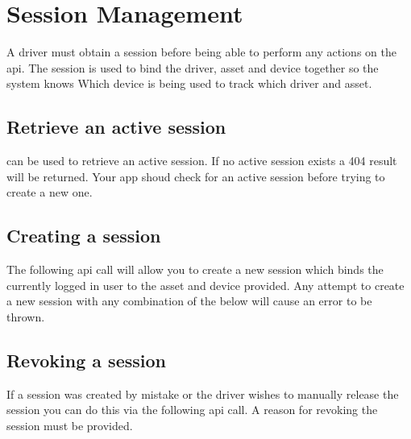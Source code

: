 \documentclass[letterpaper,10pt,english]{sphinxmanual}
\begin{document}
\section{Session Management}
\label{\detokenize{loads/drivers/sessions/session-management:session-management}}\label{\detokenize{loads/drivers/sessions/session-management::doc}}
A driver must obtain a session before being able to perform any actions on the api. The session is used to bind the driver, asset and device together so the system knows Which device is being used to track which driver and asset.


\subsection{Retrieve an active session}
\label{\detokenize{loads/drivers/sessions/session-management:retrieve-an-active-session}}
 can be used to retrieve an active session. If no active session exists a 404 result will be returned. Your app shoud check for an active session before trying to create a new one.


\subsection{Creating a session}
\label{\detokenize{loads/drivers/sessions/session-management:creating-a-session}}
The following api call will allow you to create a new session which binds the currently logged in user to the asset and device provided. Any attempt to create a new session with any combination of the below will cause an error to be thrown.

\begin{sphinxVerbatim}[commandchars=\\\{\}]
 

    
    
\end{sphinxVerbatim}


\subsection{Revoking a session}
\label{\detokenize{loads/drivers/sessions/session-management:revoking-a-session}}
If a session was created by mistake or the driver wishes to manually release the session you can do this via the following api call. A reason for revoking the session must be provided.
\end{document}
